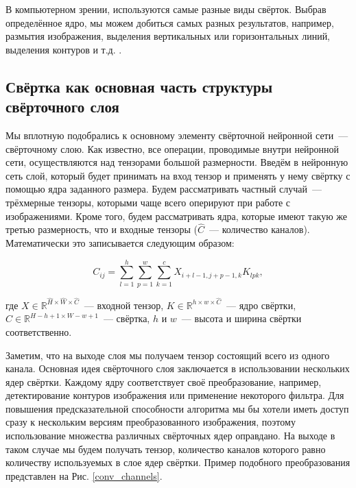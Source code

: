 \documentclass[12pt, fleqn]{article}
\begin{document}
    В компьютерном зрении, используются самые разные виды свёрток. Выбрав определённое ядро, мы можем добиться самых разных результатов, 
    например, размытия изображения, выделения вертикальных или горизонтальных линий, выделения контуров и т.д. .

    \subsection{Свёртка как основная часть структуры свёрточного слоя}

    Мы вплотную подобрались к основному элементу свёрточной нейронной сети~--- свёрточному слою.
    Как известно, все операции, проводимые внутри нейронной сети, осуществляются над тензорами
    большой размерности. Введём в нейронную сеть слой, который будет принимать на вход тензор 
    и применять у нему свёртку с помощью ядра заданного размера. Будем
    рассматривать частный случай~--- трёхмерные тензоры, которыми чаще всего оперируют при
    работе с изображениями. Кроме того, будем рассматривать ядра, которые имеют такую же третью размерность,
    что и входные тензоры ($\hat{C}$~--- количество каналов).
    Математически это записывается следующим образом:
    
    $$ C_{ij} = \sum_{l=1}^{h} \sum_{p=1}^{w} \sum_{k=1}^{c} X_{i+l-1, j+p-1, k} K_{l p k},$$

    \noindent где $X \in \mathbb{R}^{\hat{H} \times \hat{W} \times \hat{C}}$~--- входной тензор, 
    $K \in \mathbb{R}^{h\times w \times \hat{C}}$~--- ядро свёртки,
    $C \in \mathbb{R}^{H-h+1\times W-w+1}$~--- свёртка, $h$ и $w$~--- высота и ширина свёртки соответственно.

    Заметим, что на выходе слоя мы получаем тензор состоящий всего из одного канала. 
    Основная идея свёрточного слоя заключается в использовании нескольких ядер свёртки. 
    Каждому ядру соответствует своё преобразование, например, детектирование контуров изображения 
    или применение некоторого фильтра. Для повышения предсказательной способности алгоритма мы бы 
    хотели иметь доступ сразу к нескольким версиям преобразованного изображения, поэтому использование множества
    различных свёрточных ядер оправдано. На выходе в таком случае мы будем получать тензор, количество каналов которого
    равно количеству используемых в слое ядер свёртки. Пример подобного преобразования представлен на Рис. \ref{conv_channels}.
\end{document}

